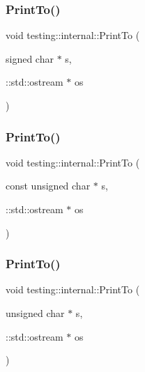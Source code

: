\mbox{\label{namespacetesting_1_1internal_a1320096b116f8cc4b688acbd5b783051}} 
\subsubsection{\texorpdfstring{PrintTo()}{PrintTo()}\hspace{0.1cm}{\footnotesize\ttfamily [13/23]}}
{\footnotesize\ttfamily void testing\+::internal\+::\+Print\+To (\begin{DoxyParamCaption}\item[{signed char $\ast$}]{s,  }\item[{\+::std\+::ostream $\ast$}]{os }\end{DoxyParamCaption})\hspace{0.3cm}{\ttfamily [inline]}}

\mbox{\label{namespacetesting_1_1internal_a42c591f2164ad105b502a9262333aed2}} 
\subsubsection{\texorpdfstring{PrintTo()}{PrintTo()}\hspace{0.1cm}{\footnotesize\ttfamily [14/23]}}
{\footnotesize\ttfamily void testing\+::internal\+::\+Print\+To (\begin{DoxyParamCaption}\item[{const unsigned char $\ast$}]{s,  }\item[{\+::std\+::ostream $\ast$}]{os }\end{DoxyParamCaption})\hspace{0.3cm}{\ttfamily [inline]}}

\mbox{\label{namespacetesting_1_1internal_a7fae797c500d66d0f5a9db4f205e3416}} 
\subsubsection{\texorpdfstring{PrintTo()}{PrintTo()}\hspace{0.1cm}{\footnotesize\ttfamily [15/23]}}
{\footnotesize\ttfamily void testing\+::internal\+::\+Print\+To (\begin{DoxyParamCaption}\item[{unsigned char $\ast$}]{s,  }\item[{\+::std\+::ostream $\ast$}]{os }\end{DoxyParamCaption})\hspace{0.3cm}{\ttfamily [inline]}}

